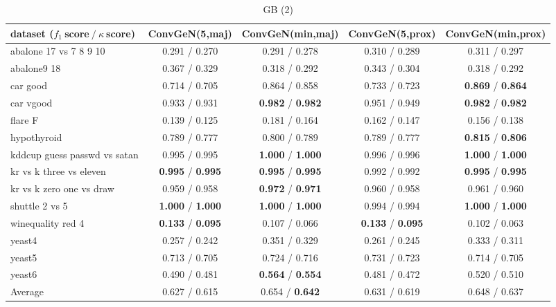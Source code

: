 \begin{table*}[ht]\scriptsize\caption{GB (2)}\label{tab:results:GB:B}\centering\tabularnewline
\begin{tabular}{l|@{\hskip3pt}c@{\hskip3pt}|@{\hskip3pt}c@{\hskip3pt}|@{\hskip3pt}c@{\hskip3pt}|@{\hskip3pt}c@{\hskip3pt}}\hline
\textbf{dataset ($f_1~$score$~/~\kappa~$score)} & \textbf{ConvGeN(5,maj)} & \textbf{ConvGeN(min,maj)} & \textbf{ConvGeN(5,prox)} & \textbf{ConvGeN(min,prox)}
\tabularnewline
\hline
abalone 17 vs 7 8 9 10 &  0.291  /  0.270  &  0.291  /  0.278  &  0.310  /  0.289  &  0.311  /  0.297 
\tabularnewline
abalone9 18 &  0.367  /  0.329  &  0.318  /  0.292  &  0.343  /  0.304  &  0.318  /  0.292 
\tabularnewline
car good &  0.714  /  0.705  &  0.864  /  0.858  &  0.733  /  0.723  &  \textbf{0.869}  /  \textbf{0.864} 
\tabularnewline
car vgood &  0.933  /  0.931  &  \textbf{0.982}  /  \textbf{0.982}  &  0.951  /  0.949  &  \textbf{0.982}  /  \textbf{0.982} 
\tabularnewline
flare F &  0.139  /  0.125  &  0.181  /  0.164  &  0.162  /  0.147  &  0.156  /  0.138 
\tabularnewline
hypothyroid &  0.789  /  0.777  &  0.800  /  0.789  &  0.789  /  0.777  &  \textbf{0.815}  /  \textbf{0.806} 
\tabularnewline
kddcup guess passwd vs satan &  0.995  /  0.995  &  \textbf{1.000}  /  \textbf{1.000}  &  0.996  /  0.996  &  \textbf{1.000}  /  \textbf{1.000} 
\tabularnewline
kr vs k three vs eleven &  \textbf{0.995}  /  \textbf{0.995}  &  \textbf{0.995}  /  \textbf{0.995}  &  0.992  /  0.992  &  \textbf{0.995}  /  \textbf{0.995} 
\tabularnewline
kr vs k zero one vs draw &  0.959  /  0.958  &  \textbf{0.972}  /  \textbf{0.971}  &  0.960  /  0.958  &  0.961  /  0.960 
\tabularnewline
shuttle 2 vs 5 &  \textbf{1.000}  /  \textbf{1.000}  &  \textbf{1.000}  /  \textbf{1.000}  &  0.994  /  0.994  &  \textbf{1.000}  /  \textbf{1.000} 
\tabularnewline
winequality red 4 &  \textbf{0.133}  /  \textbf{0.095}  &  0.107  /  0.066  &  \textbf{0.133}  /  \textbf{0.095}  &  0.102  /  0.063 
\tabularnewline
yeast4 &  0.257  /  0.242  &  0.351  /  0.329  &  0.261  /  0.245  &  0.333  /  0.311 
\tabularnewline
yeast5 &  0.713  /  0.705  &  0.724  /  0.716  &  0.731  /  0.723  &  0.714  /  0.705 
\tabularnewline
yeast6 &  0.490  /  0.481  &  \textbf{0.564}  /  \textbf{0.554}  &  0.481  /  0.472  &  0.520  /  0.510 
\tabularnewline
\hline Average &  0.627  /  0.615  &  0.654  /  \textbf{0.642}  &  0.631  /  0.619  &  0.648  /  0.637 
\tabularnewline
\hline\end{tabular}\end{table*}



